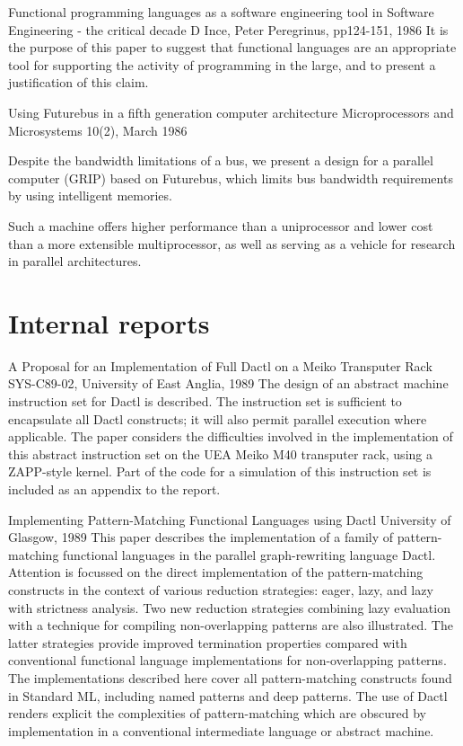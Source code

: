 {Functional programming languages as a software engineering tool}
{in Software Engineering - the critical decade D Ince,
Peter Peregrinus, pp124-151, 1986}
{
It is the purpose of this paper to suggest that functional
languages are an appropriate tool for supporting the activity
of programming in the large, and to present a justification of
this claim.
}

{Using Futurebus in a fifth generation computer architecture}
{Microprocessors and Microsystems 10(2), March 1986}
{
Despite the bandwidth limitations of a bus, we present a design
for a parallel computer (GRIP) based on Futurebus, which limits bus
bandwidth requirements by using intelligent memories.

Such a machine offers higher performance than a uniprocessor
and lower cost than a more extensible multiprocessor, as well
as serving as a vehicle for research in parallel architectures.
}

\section{Internal reports}


{A Proposal for an Implementation of Full Dactl on a Meiko Transputer Rack}
{SYS-C89-02, University of East Anglia, 1989}
{
The  design  of  an  abstract  machine  instruction  set  for  Dactl  is
described.   The  instruction set is sufficient to encapsulate all Dactl
constructs; it will also permit  parallel  execution  where  applicable.
The  paper  considers the difficulties involved in the implementation of
this abstract instruction set on the  UEA  Meiko  M40  transputer  rack,
using  a  ZAPP-style  kernel.  Part of the code for a simulation of this
instruction set is included as an appendix to the report.
}


{Implementing Pattern-Matching Functional Languages using Dactl}
{University of Glasgow, 1989}
{
This paper describes the implementation of a family of  pattern-matching
functional  languages  in  the  parallel graph-rewriting language Dactl.
Attention  is   focussed   on   the   direct   implementation   of   the
pattern-matching   constructs   in  the  context  of  various  reduction
strategies: eager, lazy, and lazy with  strictness  analysis.   Two  new
reduction  strategies  combining  lazy  evaluation  with a technique for
compiling non-overlapping patterns are  also  illustrated.   The  latter
strategies   provide   improved  termination  properties  compared  with
conventional functional  language  implementations  for  non-overlapping
patterns.  The implementations described here cover all pattern-matching
constructs found in Standard  ML,  including  named  patterns  and  deep
patterns.   The  use  of  Dactl  renders  explicit  the  complexities of
pattern-matching which are obscured by implementation in a  conventional
intermediate language or abstract machine.
}

